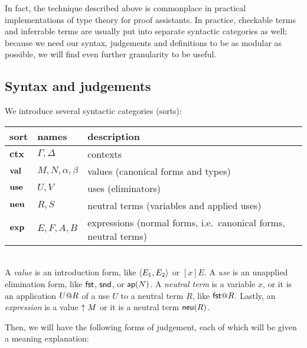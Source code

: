 \documentclass[main.tex]{subfiles}
\begin{document}
In fact, the technique described above is commonplace in practical
implementations of type theory for proof assistants. In practice,
checkable terms and inferrable terms are usually put into separate
syntactic categories as well; because we need our syntax, judgements
and definitions to be as modular as possible, we will find even
further granularity to be useful.

\subsection{Syntax and judgements}

We introduce several syntactic categories (sorts):\\

\begin{tabular}{lll}
  \toprule
  sort & names & description\\ \midrule
  $\mathbf{ctx}$ & $\Gamma, \Delta$ & contexts\\
  $\mathbf{val}$ & $M, N, \alpha, \beta$ & values (canonical forms and types) \\
  $\mathbf{use}$ & $U, V$ & uses (eliminators) \\
  $\mathbf{neu}$ & $R, S$ & neutral terms (variables and applied uses) \\
  $\mathbf{exp}$ & $E,F,A,B$ & expressions (normal forms, i.e.\ canonical forms, neutral terms)\\
  \bottomrule
\end{tabular}\\

A \emph{value} is an introduction form, like $\langle E_1,E_2\rangle$ or
$[x]E$. A \emph{use} is an unapplied elimination form, like $\mathsf{fst}$,
$\mathsf{snd}$, or $\mathsf{ap}(N)$. A \emph{neutral term} is a variable $x$, or it
is an application $U@R$ of a use $U$ to a neutral term $R$,
like $\elim{\ufst}{R}$. Lastly, an \emph{expression} is a value $\uparrow M$ or it
is a neutral term $\mathsf{neu}(R)$.

Then, we will have the following forms of judgement, each of which
will be given a meaning explanation:\\
\end{document}
